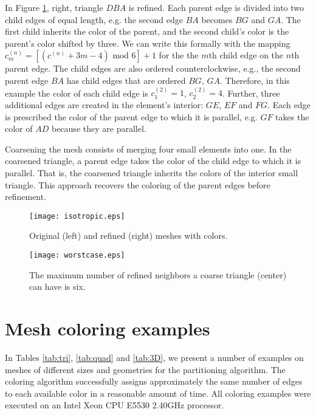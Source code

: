 \documentclass[12pt]{article}
\begin{document}
In Figure \ref{fig:isotropic}, right, triangle $DBA$ is refined.  Each parent edge is divided into two child edges of equal length, e.g. the second edge $BA$ becomes $BG$ and $GA$.  The first child inherits the color of the parent, and the second child's color is the parent's color shifted by three.  We can write this formally with the mapping $c_m^{(n)} = [(c^{(n)} + 3m -4) \text{ mod } 6]+1$ for the the $m$th child edge on the $n$th parent edge. The child edges are also ordered counterclockwise, e.g., the second parent edge $BA$ has child edges that are ordered $BG$, $GA$.  Therefore, in this example the color of each child edge is $c_1^{(2)} = 1$, $c_2^{(2)} = 4$. Further, three additional edges are created in the element's interior: $GE$, $EF$ and $FG$.  Each edge is prescribed the color of the parent edge to which it is parallel, e.g. $GF$ takes the color of $AD$ because they are parallel.


Coarsening the mesh consists of merging four small elements into one.  In the coarsened triangle, a parent edge takes the color of the child edge to which it is parallel.  That is, the coarsened triangle inherits the colors of the interior small triangle.  This approach recovers the coloring of the parent edges before refinement.






\begin{figure}
	\centering
	\texttt{[image: isotropic.eps]}
	\caption{Original (left) and refined (right) meshes with colors.}
	\label{fig:isotropic}
\end{figure}

\begin{figure}
	\centering
	\texttt{[image: worstcase.eps]}
	\caption{The maximum number of refined neighbors a coarse triangle (center) can have is six.}
	\label{fig:worstcase}
\end{figure}






\section{Mesh coloring examples} \label{sec:examples}
In Tables \ref{tab:tri}, \ref{tab:quad} and \ref{tab:3D}, we present a number of examples on meshes of different sizes and geometries for the partitioning algorithm.  The coloring algorithm successfully assigns approximately the same number of edges to each available color in a reasonable amount of time.  All coloring examples were executed on an Intel Xeon CPU E5530 2.40GHz processor.
\end{document}

